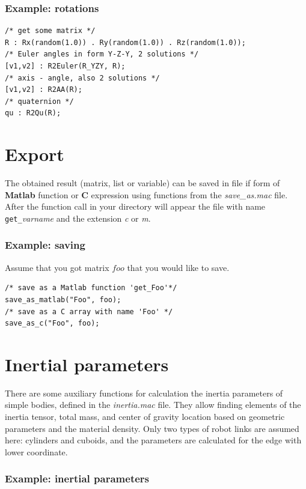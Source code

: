 \documentclass{article}
\begin{document}
\subsubsection{Example: rotations} 

\begin{verbatim}
/* get some matrix */
R : Rx(random(1.0)) . Ry(random(1.0)) . Rz(random(1.0));
/* Euler angles in form Y-Z-Y, 2 solutions */
[v1,v2] : R2Euler(R_YZY, R);
/* axis - angle, also 2 solutions */
[v1,v2] : R2AA(R);
/* quaternion */
qu : R2Qu(R);
\end{verbatim}

\section{Export}

The obtained result (matrix, list or variable) can be saved in file if form of \textbf{Matlab} function or \textbf{C} expression using functions from the \textit{save\_as.mac} file. After the function call in your directory will appear the file with name \texttt{get\_}\textit{varname} and the extension \textit{c} or \textit{m}. 

\subsubsection{Example: saving}

Assume that you got matrix $foo$ that you would like to save.
\begin{verbatim}
/* save as a Matlab function 'get_Foo'*/
save_as_matlab("Foo", foo);
/* save as a C array with name 'Foo' */
save_as_c("Foo", foo);
\end{verbatim}

\section{Inertial parameters}

There are some auxiliary functions for calculation the inertia parameters of simple bodies, defined in the \textit{inertia.mac} file. They allow finding elements of the inertia tensor, total mass, and center of gravity location based on geometric parameters and the material density. Only two types of robot links are assumed here: cylinders and cuboids, and the parameters are calculated for the edge with lower coordinate. 

\subsubsection{Example: inertial parameters}
\end{document}
